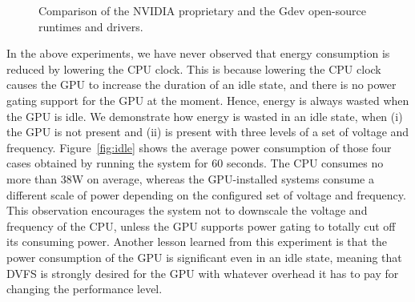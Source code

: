 \begin{figure}[!t]
  \centering
  \vspace{-5.0mm}
  \caption{Comparison of the NVIDIA proprietary and the Gdev open-source
 runtimes and drivers.}
  \label{fig:nvidia-gdev}
\end{figure}

In the above experiments, we have never observed that energy consumption
is reduced by lowering the CPU clock. 
This is because lowering the CPU clock causes the GPU to increase the
duration of an idle state, and there is no power gating support for the
GPU at the moment.
Hence, energy is always wasted when the GPU is idle.
We demonstrate how energy is wasted in an idle state, when (i) the GPU
is not present and (ii) is present with three levels of a set of voltage
and frequency.
Figure~\ref{fig:idle} shows the average power consumption of those four
cases obtained by running the system for 60 seconds.
The CPU consumes no more than 38W on average, whereas the GPU-installed
systems consume a different scale of power depending on the configured
set of voltage and frequency.
This observation encourages the system not to downscale the voltage and
frequency of the CPU, unless the GPU supports power gating to totally
cut off its consuming power.
Another lesson learned from this experiment is that the power
consumption of the GPU is significant even in an idle state, meaning
that DVFS is strongly desired for the GPU with whatever overhead it has
to pay for changing the performance level.

